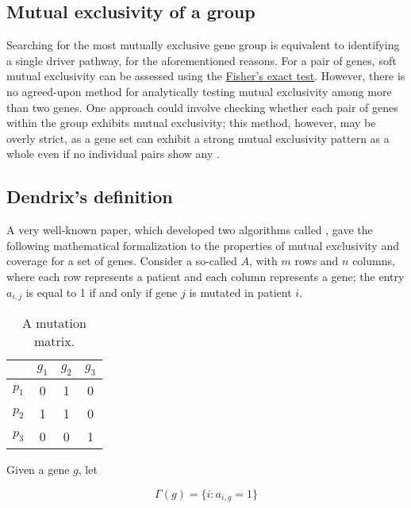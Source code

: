 \subsection{Mutual exclusivity of a group}

Searching for the most mutually exclusive gene group is equivalent to identifying a single driver pathway, for the aforementioned reasons. For a pair of genes, soft mutual exclusivity can be assessed using the \href{https://en.wikipedia.org/wiki/Fisher\%27s_exact_test}{Fisher's exact test}. However, there is no agreed-upon method for analytically testing mutual exclusivity among more than two genes. One approach could involve checking whether each pair of genes within the group exhibits mutual exclusivity; this method, however, may be overly strict, as a gene set can exhibit a strong mutual exclusivity pattern as a whole even if no individual pairs show any \cite{mutex}.

\subsection{Dendrix's definition}

A very well-known paper, which developed two algorithms called  \cite{dendrix}, gave the following mathematical formalization to the properties of mutual exclusivity and coverage for a set of genes. Consider a so-called  $A$, with $m$ rows and $n$ columns, where each row represents a patient and each column represents a gene; the entry $a_{i, j}$ is equal to 1 if and only if gene $j$ is mutated in patient $i$.

\begin{table}[H]
    \centering
    \begin{tabular}{c|ccc}
              & $g_1$ & $g_2$ & $g_3$ \\
        \hline
        $p_1$ & 0 & 1 & 0 \\
        \hline
        $p_2$ & 1 & 1 & 0 \\
        \hline
        $p_3$ & 0 & 0 & 1 \\
    \end{tabular}
    \caption{A mutation matrix.}\label{mutation_matrix}
\end{table}

Given a gene $g$, let

\begin{equation}
    \Gamma(g) = \{i : a_{i, g} = 1\}
\end{equation}

